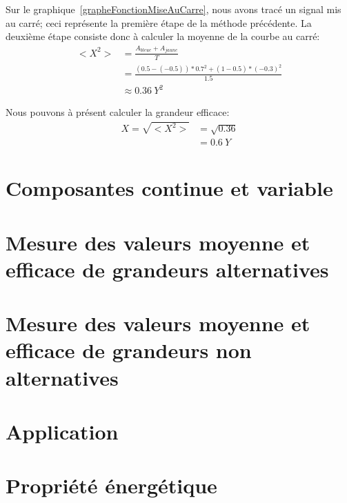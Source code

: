 \documentclass[11pt,a4paper,openany]{book}
\begin{document}
Sur le graphique~\ref{grapheFonctionMiseAuCarre}, nous avons tracé un signal mis au carré; ceci représente la première étape de la méthode précédente. La deuxième étape consiste donc à calculer la moyenne de la courbe au carré:
\begin{align*}
<X^{2}> & = \frac{A_{bleue} + A_{jaune}}{T}\\
	& = \frac{(0.5 - (-0.5))*0.7^{2} + (1 - 0.5)*(-0.3)^{2}}{1.5}\\
	& \approx 0.36~Y^{2}
\end{align*}

Nous pouvons à présent calculer la grandeur efficace:
\begin{align*}
X = \sqrt{<X^{2}>} & = \sqrt{0.36}\\
				   & = 0.6~Y
\end{align*}

\section{Composantes continue et variable}

\section{Mesure des valeurs moyenne et efficace de grandeurs alternatives}

\section{Mesure des valeurs moyenne et efficace de grandeurs non alternatives}

\section{Application}

\section{Propriété énergétique}

\end{document}

